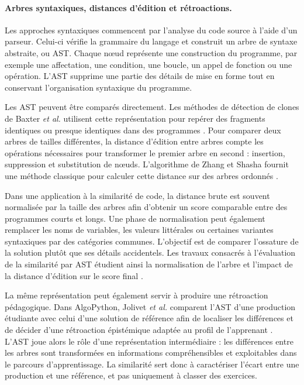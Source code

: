 \documentclass[12pt,a4paper,oneside]{report}
\begin{document}
\paragraph{Arbres syntaxiques, distances d'édition et rétroactions.}

Les approches syntaxiques commencent par l'analyse du code source à l'aide
d'un parseur. Celui-ci vérifie la grammaire du langage et construit un arbre
de syntaxe abstraite, ou AST. Chaque nœud représente une construction du
programme, par exemple une affectation, une condition, une boucle, un appel
de fonction ou une opération. L'AST supprime une partie des détails de mise
en forme tout en conservant l'organisation syntaxique du programme.

Les AST peuvent être comparés directement. Les méthodes de détection de
clones de Baxter \emph{et al.} utilisent cette représentation pour repérer
des fragments identiques ou presque identiques dans des programmes
\cite{baxter_clone_1998}. Pour comparer deux arbres de tailles différentes, la
distance d'édition entre arbres compte les opérations nécessaires pour
transformer le premier arbre en second : insertion, suppression et
substitution de nœuds. L'algorithme de Zhang et Shasha fournit une méthode
classique pour calculer cette distance sur des arbres ordonnés
\cite{zhang_simple_1989}.

Dans une application à la similarité de code, la distance brute est souvent
normalisée par la taille des arbres afin d'obtenir un score comparable entre
des programmes courts et longs. Une phase de normalisation peut également
remplacer les noms de variables, les valeurs littérales ou certaines
variantes syntaxiques par des catégories communes. L'objectif est de
comparer l'ossature de la solution plutôt que ses détails accidentels. Les
travaux consacrés à l'évaluation de la similarité par AST étudient ainsi la
normalisation de l'arbre et l'impact de la distance d'édition sur le score
final \cite{song_revisiting_2024}.

La même représentation peut également servir à produire une rétroaction
pédagogique. Dans AlgoPython, Jolivet \emph{et al.} comparent l'AST d'une
production étudiante avec celui d'une solution de référence afin de localiser
les différences et de décider d'une rétroaction épistémique adaptée au profil
de l'apprenant \cite{jolivet_modelisation_2025}. L'AST joue alors le rôle
d'une représentation intermédiaire : les différences entre les arbres sont
transformées en informations compréhensibles et exploitables dans le parcours
d'apprentissage. La similarité sert donc à caractériser l'écart entre une
production et une référence, et pas uniquement à classer des exercices.
\end{document}
